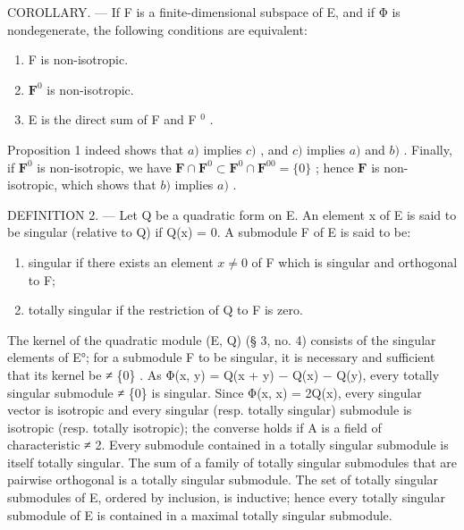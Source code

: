 COROLLARY. --- If F is a finite-dimensional subspace of E, and if Φ is nondegenerate, the following conditions are equivalent:

\begin{enumerate}
\def\labelenumi{\alph{enumi})}
\item
  F is non-isotropic.
\item
  \(\mathbf{F}^0\) is non-isotropic.
\item
  E is the direct sum of F and F \(^{0}\) .
\end{enumerate}

Proposition 1 indeed shows that \(a)\) implies \(c)\) , and \(c)\) implies \(a)\) and \(b)\) . Finally, if \(\mathbf{F}^0\) is non-isotropic, we have \(\mathbf{F} \cap \mathbf{F}^0 \subset \mathbf{F}^0 \cap \mathbf{F}^{00} = \{0\}\) ; hence \(\mathbf{F}\) is non-isotropic, which shows that \(b)\) implies \(a)\) .

DEFINITION 2. --- Let Q be a quadratic form on E. An element x of E is said to be singular (relative to Q) if Q(x) = 0. A submodule F of E is said to be:

\begin{enumerate}
\def\labelenumi{\arabic{enumi})}
\item
  singular if there exists an element \(x \neq 0\) of F which is singular and orthogonal to F;
\item
  totally singular if the restriction of Q to F is zero.
\end{enumerate}

The kernel of the quadratic module (E, Q) (§ 3, no. 4) consists of the singular elements of E°; for a submodule F to be singular, it is necessary and sufficient that its kernel be ≠ \{0\} . As Φ(x, y) = Q(x + y) − Q(x) − Q(y), every totally singular submodule ≠ \{0\} is singular. Since Φ(x, x) = 2Q(x), every singular vector is isotropic and every singular (resp. totally singular) submodule is isotropic (resp. totally isotropic); the converse holds if A is a field of characteristic ≠ 2. Every submodule contained in a totally singular submodule is itself totally singular. The sum of a family of totally singular submodules that are pairwise orthogonal is a totally singular submodule. The set of totally singular submodules of E, ordered by inclusion, is inductive; hence every totally singular submodule of E is contained in a maximal totally singular submodule.

